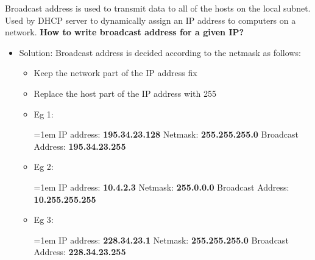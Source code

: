 \setlength{\columnsep}{3pt}
\begin{flushleft}
\bigskip
Broadcast address is used to transmit data to all of the hosts on the local subnet.
\newline
Used by DHCP server to dynamically assign an IP address to computers on a network.
\newline
\newline
\textbf{How to write broadcast address for a given IP?}
\begin{itemize}
	\item Solution: Broadcast address is decided according to the netmask as follows:
	\begin{itemize}
		\item Keep the network part of the IP address fix
		\item Replace the host part of the IP address with 255
		\item Eg 1:
		\bigskip
		\begin{tcolorbox}[breakable,notitle,boxrule=-0pt,colback=pink,colframe=pink]
			\color{black}
			\font=1em
			IP address: \textbf{195.34.23.128}
			\newline
			Netmask: \textbf{255.255.255.0}
			\newline
			Broadcast Address: \textbf{195.34.23.255}
			\font=4pt
		\end{tcolorbox}
		\item Eg 2:
		\bigskip
		\begin{tcolorbox}[breakable,notitle,boxrule=-0pt,colback=pink,colframe=pink]
			\color{black}
			\font=1em
			IP address: \textbf{10.4.2.3}
			\newline
			Netmask: \textbf{255.0.0.0}
			\newline
			Broadcast Address: \textbf{10.255.255.255}
			\font=4pt
		\end{tcolorbox}
	\item Eg 3:
	\bigskip
	\begin{tcolorbox}[breakable,notitle,boxrule=-0pt,colback=pink,colframe=pink]
		\color{black}
		\font=1em
		IP address: \textbf{228.34.23.1}
		\newline
		Netmask: \textbf{255.255.255.0}
		\newline
		Broadcast Address: \textbf{228.34.23.255}
		\font=4pt
	\end{tcolorbox}
	\end{itemize}


\end{itemize}

\end{flushleft}
\newpage